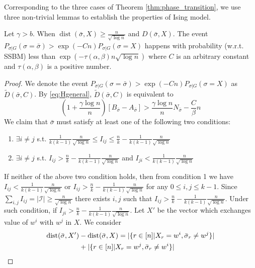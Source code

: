 \documentclass[entropy,article,submit,moreauthors,pdftex]{Definitions/mdpi}
\newcommand{\cI}{\mathcal{I}}
\newcommand{\1}{\mathbbm{1}}
\DeclareMathOperator{\Dist}{dist}
\begin{document}
Corresponding to the three cases of Theorem \ref{thm:phase_transition}, we use three non-trivial lemmas to 
establish the properties of Ising model.
\begin{Lemma}\label{lem:sigmaX}
	Let $\gamma > b$. When $\Dist(\bar{\sigma}, X) \geq \frac{n}{\sqrt{\log n}}$ and $D(\bar{\sigma}, X)$. The event
	$P_{\sigma | G}(\sigma = \bar{\sigma} ) > \exp(-Cn) P_{\sigma | G}(\sigma = X)$
	happens with probability (w.r.t. SSBM) less than $\exp(-\tau(\alpha,\beta) n \sqrt{\log  n} )$
	where $C$ is an arbitrary constant and $\tau(\alpha,\beta)$ is a positive number.
\end{Lemma}
\begin{proof}
	We denote the event $P_{\sigma | G}(\sigma = \bar{\sigma} ) > \exp(-Cn) P_{\sigma | G}(\sigma = X)$ as $\widetilde{D}(\bar{\sigma}, C)$.
	By \eqref{eq:Hgeneral}, $\widetilde{D}(\bar{\sigma}, C)$
	is equivalent to
	\begin{equation}\label{eq:BwA}
	(1 + \frac{\gamma \log n}{n})[B_{\bar{\sigma}} - A_{\bar{\sigma}}] >  \frac{\gamma \log n}{n} N_{\bar{\sigma}}  - \frac{C}{\beta} n
	\end{equation}
	We claim that $\bar{\sigma}$ must satisfy at least one of the following two conditions:
	\begin{enumerate}
		\item $\exists i\neq j$ s.t. $\frac{1}{k(k-1)}\frac{n}{\sqrt{\log n}} \leq I_{ij} \leq \frac{n}{k} - \frac{1}{k(k-1)}\frac{n}{\sqrt{\log n}}$
		\item $\exists i \neq j$ s.t. $I_{ij} > \frac{n}{k} - \frac{1}{k(k-1)}\frac{n}{\sqrt{\log n}}$ and $I_{ji} < \frac{1}{k(k-1)}\frac{n}{\sqrt{\log n}}$
	\end{enumerate}
	If neither of the above two condition holds, then from condition 1 we have
	$I_{ij} < \frac{1}{k(k-1)}\frac{n}{\sqrt{\log n}}$ or $I_{ij} > \frac{n}{k} - \frac{1}{k(k-1)}\frac{n}{\sqrt{\log n}}$ for any $0 \leq i,j\leq k-1$.
	Since $\sum_{i,j} I_{ij} = |\cI| \geq \frac{n}{\sqrt{\log n}}$ there exists $i,j$ such that $I_{ij} > \frac{n}{k} - \frac{1}{k(k-1)}\frac{n}{\sqrt{\log n}}$.
	Under such condition, if $I_{ji} > \frac{n}{k} - \frac{1}{k(k-1)}\frac{n}{\sqrt{\log n}}$.
	Let $X'$ be the vector which exchanges value of $w^i$ with $w^j$ in $X$. We consider
	\begin{align}
	 \Dist(\bar{\sigma}, X') & - \Dist(\bar{\sigma}, X)= |\{ r \in [n]|X_r=w^i, \bar{\sigma}_r \neq w^j \}| \notag\\
	&+ |\{ r \in [n]|X_r=w^j, \bar{\sigma}_r \neq w^i \}| \notag\\

\end{align}
\end{proof}
\end{document}
